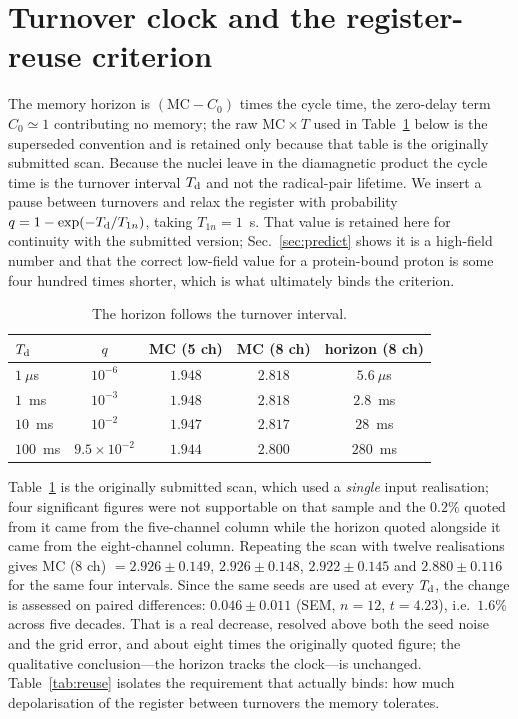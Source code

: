 \documentclass[aps,prx,reprint,superscriptaddress,nofootinbib,floatfix]{revtex4-2}
\begin{document}
\section{Turnover clock and the register-reuse criterion}
\label{sec:clock}
The memory horizon is $(\mathrm{MC}-C_0)$ times the cycle time, the zero-delay
term $C_0\simeq1$ contributing no memory; the raw $\mathrm{MC}\times T$ used in
Table~\ref{tab:clock} below is the superseded convention and is retained only
because that table is the originally submitted scan. Because the nuclei leave in
the diamagnetic product the cycle time is the turnover interval $T_{\rm d}$ and
not the radical-pair lifetime. We insert a pause between turnovers and relax the
register with probability $q=1-\exp(-T_{\rm d}/T_{1n})$, taking $T_{1n}=1$~s.
That value is retained here for continuity with the submitted version;
Sec.~\ref{sec:predict} shows it is a high-field number and that the correct
low-field value for a protein-bound proton is some four hundred times shorter,
which is what ultimately binds the criterion.

\begin{table}[H]
\caption{\label{tab:clock}The horizon follows the turnover interval.}
\begin{ruledtabular}
\begin{tabular}{lcccc}
$T_{\rm d}$ & $q$ & MC (5 ch) & MC (8 ch) & horizon (8 ch) \\
\hline
$1~\mu$s & $10^{-6}$ & $1.948$ & $2.818$ & $5.6~\mu$s \\
$1$~ms & $10^{-3}$ & $1.948$ & $2.818$ & $2.8$~ms \\
$10$~ms & $10^{-2}$ & $1.947$ & $2.817$ & $28$~ms \\
$100$~ms & $9.5\times10^{-2}$ & $1.944$ & $2.800$ & $280$~ms \\
\end{tabular}
\end{ruledtabular}
\end{table}

Table~\ref{tab:clock} is the originally submitted scan, which used a \emph{single}
input realisation; four significant figures were not supportable on that sample and
the $0.2\%$ quoted from it came from the five-channel column while the horizon
quoted alongside it came from the eight-channel column. Repeating the scan with
twelve realisations gives $\mathrm{MC}$ (8 ch) $=2.926\pm0.149$, $2.926\pm0.148$,
$2.922\pm0.145$ and $2.880\pm0.116$ for the same four intervals. Since the same
seeds are used at every $T_{\rm d}$, the change is assessed on paired differences:
$0.046\pm0.011$ (SEM, $n=12$, $t=4.23$), i.e.\ $1.6\%$ across five decades. That
is a real decrease, resolved above both the seed noise and the grid error, and
about eight times the originally quoted figure; the qualitative conclusion---the
horizon tracks the clock---is unchanged. Table~\ref{tab:reuse} isolates the
requirement that actually binds: how much depolarisation of the register between
turnovers the memory tolerates.
\end{document}
